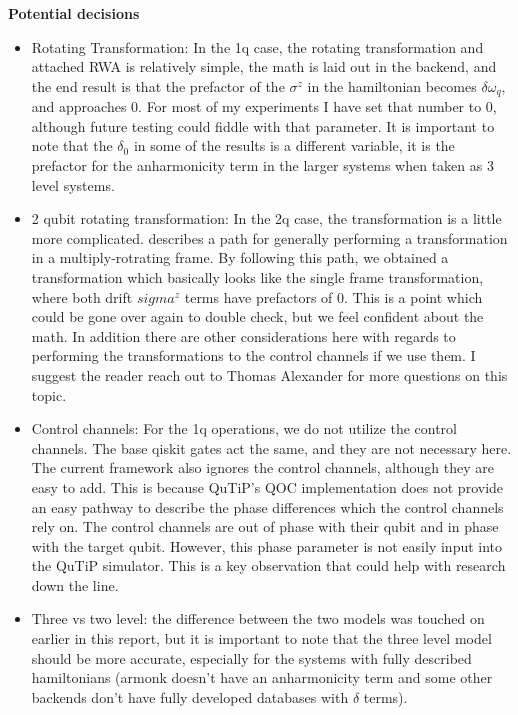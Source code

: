 \documentclass[12pt]{article}
\begin{document}
    \textbf{Potential decisions}
\begin{itemize}
    \item Rotating Transformation: In the 1q case, the rotating transformation
    and attached RWA is relatively simple, the math is laid out in the backend,
    and the end result is that the prefactor of the $\sigma^z$ in the
    hamiltonian becomes $\delta \omega_{q}$, and approaches 0. For most of my
    experiments I have set that number to 0, although future testing could
    fiddle with that parameter. It is important to note that the $\delta_0$ in
    some of the results is a different variable, it is the prefactor for the
    anharmonicity term in the larger systems when taken as 3 level systems.
    \item 2 qubit rotating transformation: In the 2q case, the transformation is
    a little more complicated. \cite{fisher_optimal_nodate} describes a path for
    generally performing a transformation in a multiply-rotrating frame. By
    following this path, we obtained a transformation which basically looks like
    the single frame transformation, where both drift $sigma^z$ terms have
    prefactors of 0. This is a point which could be gone over again to double
    check, but we feel confident about the math. In addition there are other
    considerations here with regards to performing the transformations to the
    control channels if we use them. I suggest the reader reach out to Thomas
    Alexander for more questions on this topic.
    \item Control channels: For the 1q operations, we do not utilize the control
    channels. The base qiskit gates act the same, and they are not necessary
    here. The current framework also ignores the control channels, although they
    are easy to add. This is because QuTiP's QOC implementation does not provide
    an easy pathway to describe the phase differences which the control channels
    rely on. The control channels are out of phase with their qubit and in phase
    with the target qubit. However, this phase parameter is not easily input
    into the QuTiP simulator. This is a key observation that could help with
    research down the line.
    \item Three vs two level: the difference between the two models was touched
    on earlier in this report, but it is important to note that the three level
    model should be more accurate, especially for the systems with fully
    described hamiltonians (armonk doesn't have an anharmonicity term and some
    other backends don't have fully developed databases with $\delta$ terms).

\end{itemize}
\end{document}
